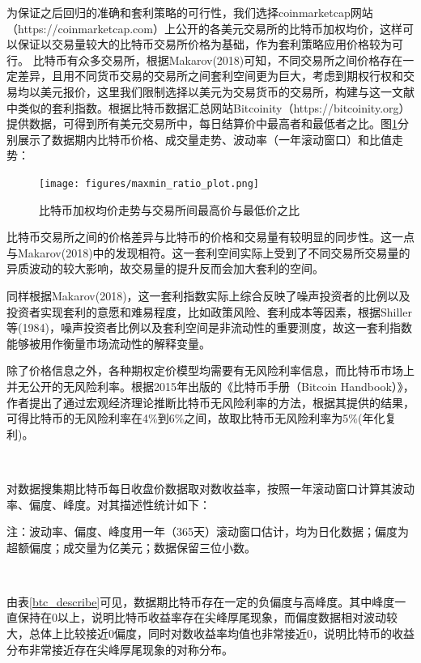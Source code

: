 \par{为保证之后回归的准确和套利策略的可行性，我们选择coinmarketcap网站（https://coinmarketcap.com）上公开的各美元交易所的比特币加权均价，这样可以保证以交易量较大的比特币交易所价格为基础，作为套利策略应用价格较为可行。
比特币有众多交易所，根据Makarov(2018)可知，不同交易所之间价格存在一定差异，且用不同货币交易的交易所之间套利空间更为巨大\cite{Makarov-2018}，考虑到期权行权和交易均以美元报价，这里我们限制选择以美元为交易货币的交易所，构建与这一文献中类似的套利指数。根据比特币数据汇总网站Bitcoinity（https://bitcoinity.org）提供数据，可得到所有美元交易所中，每日结算价中最高者和最低者之比。图\ref{maxmin_ratio}分别展示了数据期内比特币价格、成交量走势、波动率（一年滚动窗口）和比值走势：
\begin{figure}[H]
\begin{small}
    \begin{center}
        \texttt{[image: figures/maxmin\_ratio\_plot.png]} 
    \end{center}
    \caption{比特币加权均价走势与交易所间最高价与最低价之比}
    \label{maxmin_ratio}
\end{small}
\end{figure}
}
\par{比特币交易所之间的价格差异与比特币的价格和交易量有较明显的同步性。这一点与Makarov(2018)中的发现相符\cite{Makarov-2018}。这一套利空间实际上受到了不同交易所交易量的异质波动的较大影响，故交易量的提升反而会加大套利的空间。}
\par{同样根据Makarov(2018)，这一套利指数实际上综合反映了噪声投资者的比例以及投资者实现套利的意愿和难易程度，比如政策风险、套利成本等因素，根据Shiller等(1984)，噪声投资者比例以及套利空间是非流动性的重要测度，故这一套利指数能够被用作衡量市场流动性的解释变量。}

\par{除了价格信息之外，各种期权定价模型均需要有无风险利率信息，而比特币市场上并无公开的无风险利率。根据2015年出版的《比特币手册（Bitcoin Handbook）》\cite{WESNER2015223}，作者提出了通过宏观经济理论推断比特币无风险利率的方法，根据其提供的结果，可得比特币的无风险利率在4$\%$到6$\%$之间，故取比特币无风险利率为5$\%$(年化复利)。
}

~\\
\par{
对数据搜集期比特币每日收盘价数据取对数收益率，按照一年滚动窗口计算其波动率、偏度、峰度。对其描述性统计如下：}
\begin{center}
\begin{threeparttable}[H]
    
    \centering
    \caption{比特币数据描述性统计}
    \label{btc_describe}
    
    \begin{tablenotes}
        \footnotesize
        \item 注：波动率、偏度、峰度用一年（365天）滚动窗口估计，均为日化数据；偏度为超额偏度；成交量为亿美元；数据保留三位小数。
    \end{tablenotes}
\end{threeparttable}
\end{center}

~\\
\par{

由表\ref{btc_describe}可见，数据期比特币存在一定的负偏度与高峰度。其中峰度一直保持在0以上，说明比特币收益率存在尖峰厚尾现象，而偏度数据相对波动较大，总体上比较接近0偏度，同时对数收益率均值也非常接近0，说明比特币的收益分布非常接近存在尖峰厚尾现象的对称分布。
}
